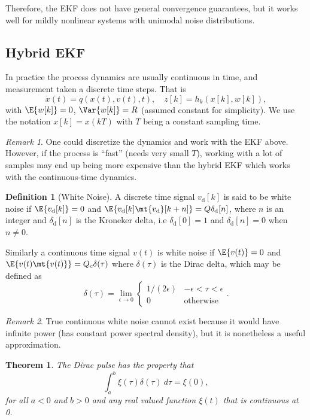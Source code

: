 \documentclass[]{hsrzf}
\theoremstyle{plain}
\newtheorem{thm}{Theorem}[section]
\theoremstyle{definition}
\newtheorem{defn}{Definition}[section]
\theoremstyle{remark}
\newtheorem*{remark}{Remark}
\begin{document}
Therefore, the EKF does not have general convergence guarantees, but it works
well for mildly nonlinear systems with unimodal noise distributions.

\subsection{Hybrid EKF}

In practice the process dynamics are usually continuous in time, and
measurement taken a discrete time steps. That is
\[
  \dot{x}(t) = q(x(t), v(t), t),
  \quad z[k] = h_k(x[k], w[k]),
\]
with $\E{w[k]} = 0$, $\Var{w[k]} = R$ (assumed constant for simplicity). We
use the notation $x[k] = x(kT)$ with $T$ being a constant sampling time.

\begin{remark}
  One could discretize the dynamics and work with the EKF above. However, if
  the process is ``fast'' (needs very small $T$), working with a lot of
  samples may end up being more expensive than the hybrid EKF which works with
  the continuous-time dynamics.
\end{remark}

\begin{defn}[White Noise]
  A discrete time signal $v_\mathrm{d}[k]$ is said to be white noise if
  $\E{v_\mathrm{d}[k]} = 0$ and \allowbreak$\E{v_\mathrm{d}[k]
  \mt{v_\mathrm{d}}[k+n]} = Q\delta_\mathrm{d}[n]$, where $n$ is an integer
  and $\delta_\mathrm{d}[n]$ is the Kroneker delta, i.e $\delta_\mathrm{d}[0]
  = 1$ and $\delta_\mathrm{d}[n] = 0$ when $n \neq 0$.

  Similarly a continuous time signal $v(t)$ is white noise if $\E{v(t)} = 0$
  and $\E{v(t) \mt{v(t)}} = Q_c \delta(\tau)$ where $\delta(\tau)$ is the
  Dirac delta, which may be defined as
  \[
    \delta(\tau) = \lim_{\epsilon \to 0} \begin{cases}
      1/(2\epsilon) & -\epsilon < \tau < \epsilon \\
      0 & \text{otherwise}
    \end{cases}.
  \]
\end{defn}

\begin{remark}
  True continuous white noise cannot exist because it would have infinite
  power (has constant power spectral density), but it is nonetheless a useful
  approximation.
\end{remark}

\begin{thm}
  The Dirac pulse has the property that
  \[
    \int_a^b \xi(\tau) \delta(\tau) ~d\tau = \xi(0),
  \]
  for all $a < 0$ and $b > 0$ and any real valued function $\xi(t)$ that is
  continuous at 0.
\end{thm}
\end{document}
